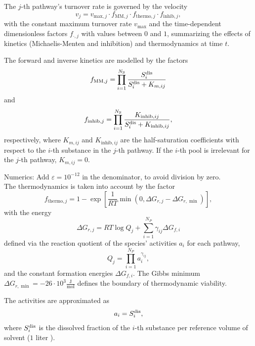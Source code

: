 \documentclass{article}
\begin{document}
The $j$-th pathway's turnover rate is governed by the velocity
\begin{equation}
v_j = v_{\mathrm{max},j} \cdot f_{\mathrm{MM},j} \cdot f_{\mathrm{thermo},j}\cdot f_{\mathrm{inhib},j},
\end{equation}
with the constant maximum turnover rate $v_{\mathrm{max}}$ and the time-dependent dimensionless factors $f_{\cdot,j}$ with values between $0$ and $1$, summarizing the effects of kinetics (Michaelis-Menten and inhibition) and thermodynamics at time $t$.

The forward and inverse kinetics are modelled by the factors
\begin{equation}
f_{\mathrm{MM},j} = \prod_{i = 1}^{N_{\mathrm{S}}} \frac{S^{\mathrm{dis}}_i}{S^{\mathrm{dis}}_i + K_{m,ij}}
\end{equation}
and 
\begin{equation}
f_{\mathrm{inhib},j} = \prod_{i = 1}^{N_{\mathrm{S}}} \frac{K_{\mathrm{inhib},ij}}{S^{\mathrm{dis}}_i + K_{\mathrm{inhib},ij}},
\end{equation}
respectively, where $K_{m,ij}$ and $K_{\mathrm{inhib}, ij}$ are the half-saturation coefficients with respect to the $i$-th substance in the $j$-th pathway.
If the $i$-th pool is irrelevant for the $j$-th pathway, $K_{m,ij} = 0$.

Numerics: Add $\varepsilon = 10^{-12}$ in the denominator, to avoid division by zero.
\\

The thermodynamics is taken into account by the factor
\begin{equation}
f_{\mathrm{thermo},j} = 1 - \exp\left[\frac{1}{RT}\min(0, \Delta G_{r,j} - \Delta G_{r,\min})\right],
\end{equation}
with the energy
\begin{equation}
\Delta G_{r,j} =  R T \log Q_j + \sum_{i = 1}^{N_P} \gamma_{ij}\Delta G_{f,i}
\end{equation}
defined via the reaction quotient of the species' activities $a_i$ for each pathway,
\begin{equation}
Q_j = \prod_{i =1}^{N_P} a_{i}^{\gamma_{ij}},
\end{equation}
and the constant formation energies $\Delta G_{f,i}$.
The Gibbs minimum \mbox{$\Delta G_{r,\min} = -26 \cdot 10^3 \frac{\mathrm{J}}{\mathrm{mol}}$} defines the boundary of thermodynamic viability.

The activities are approximated as
\begin{equation}
a_i = S^{\mathrm{dis}}_i,
\end{equation}
where $S^{\mathrm{dis}}_i$ is the dissolved fraction of the $i$-th substance per reference volume of solvent ($1$ liter ).
\\
\end{document}
